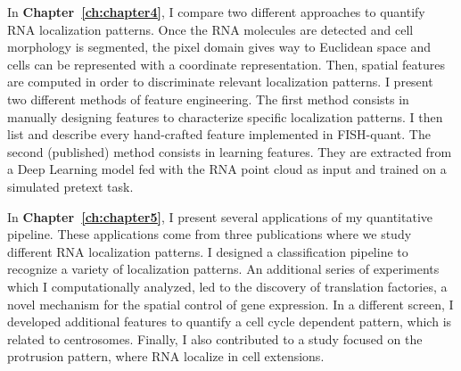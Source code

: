 In \textbf{Chapter~\ref{ch:chapter4}}, I compare two different approaches to quantify \ac{RNA} localization patterns.
Once the \ac{RNA} molecules are detected and cell morphology is segmented, the pixel domain gives way to Euclidean space and cells can be represented with a coordinate representation.
Then, spatial features are computed in order to discriminate relevant localization patterns.
I present two different methods of feature engineering.
The first method consists in manually designing features to characterize specific localization patterns.
I then list and describe every hand-crafted feature implemented in FISH-quant.
The second (published) method consists in learning features.
They are extracted from a Deep Learning model fed with the \ac{RNA} point cloud as input and trained on a simulated pretext task.

In \textbf{Chapter~\ref{ch:chapter5}}, I present several applications of my quantitative pipeline.
These applications come from three publications where we study different \ac{RNA} localization patterns.
I designed a classification pipeline to recognize a variety of localization patterns.
An additional series of experiments which I computationally analyzed, led to the discovery of translation factories, a novel mechanism for the spatial control of gene expression.
In a different screen, I developed additional features to quantify a cell cycle dependent pattern, which is related to centrosomes.
Finally, I also contributed to a study focused on the protrusion pattern, where \ac{RNA} localize in cell extensions.